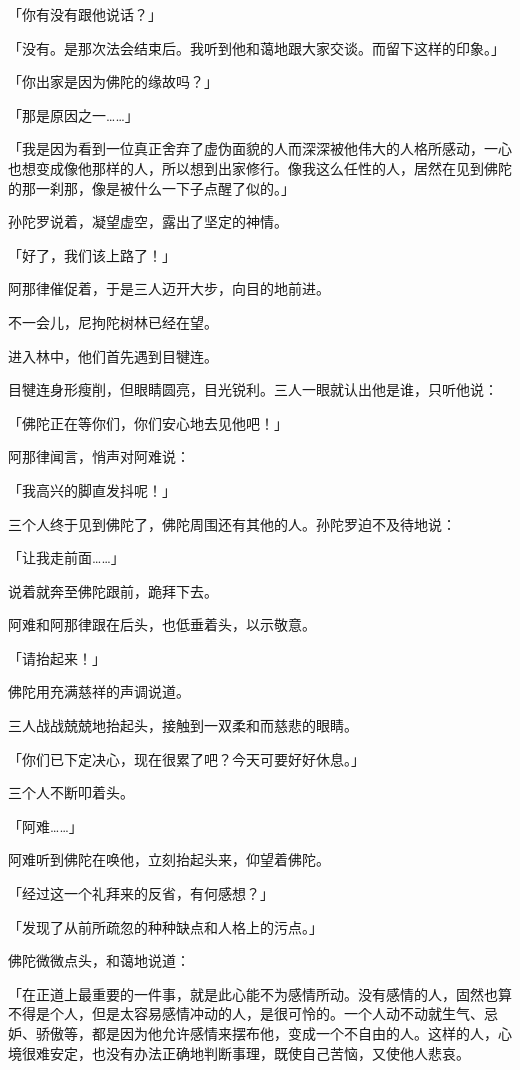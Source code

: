 \documentclass[twoside,openany]{book}
\begin{document}
「你有没有跟他说话？」

「没有。是那次法会结束后。我听到他和蔼地跟大家交谈。而留下这样的印象。」

「你出家是因为佛陀的缘故吗？」

「那是原因之一……」

「我是因为看到一位真正舍弃了虚伪面貌的人而深深被他伟大的人格所感动，一心也想变成像他那样的人，所以想到出家修行。像我这么任性的人，居然在见到佛陀的那一刹那，像是被什么一下子点醒了似的。」

孙陀罗说着，凝望虚空，露出了坚定的神情。

「好了，我们该上路了！」

阿那律催促着，于是三人迈开大步，向目的地前进。

不一会儿，尼拘陀树林已经在望。

进入林中，他们首先遇到目犍连。

目犍连身形瘦削，但眼睛圆亮，目光锐利。三人一眼就认出他是谁，只听他说：

「佛陀正在等你们，你们安心地去见他吧！」

阿那律闻言，悄声对阿难说：

「我高兴的脚直发抖呢！」

三个人终于见到佛陀了，佛陀周围还有其他的人。孙陀罗迫不及待地说：

「让我走前面……」

说着就奔至佛陀跟前，跪拜下去。

阿难和阿那律跟在后头，也低垂着头，以示敬意。

「请抬起来！」

佛陀用充满慈祥的声调说道。

三人战战兢兢地抬起头，接触到一双柔和而慈悲的眼睛。

「你们已下定决心，现在很累了吧？今天可要好好休息。」

三个人不断叩着头。

「阿难……」

阿难听到佛陀在唤他，立刻抬起头来，仰望着佛陀。

「经过这一个礼拜来的反省，有何感想？」





「发现了从前所疏忽的种种缺点和人格上的污点。」

佛陀微微点头，和蔼地说道：

「在正道上最重要的一件事，就是此心能不为感情所动。没有感情的人，固然也算不得是个人，但是太容易感情冲动的人，是很可怜的。一个人动不动就生气、忌妒、骄傲等，都是因为他允许感情来摆布他，变成一个不自由的人。这样的人，心境很难安定，也没有办法正确地判断事理，既使自己苦恼，又使他人悲哀。
\end{document}
